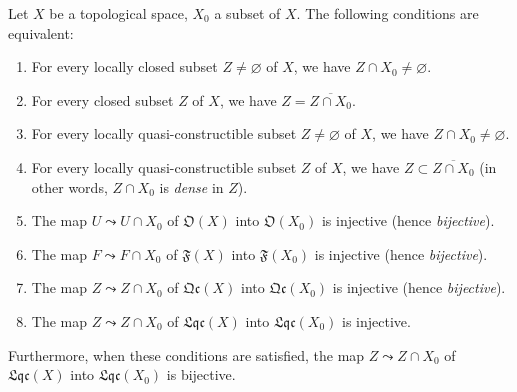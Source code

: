 \begin{proposition}[10.1.2]
\label{IV.10.1.2}
Let $X$ be a topological space, $X_0$ a subset of $X$.
The following conditions are equivalent:
\begin{enumerate}[label=\emph{\alph*)}]
  \item For every locally closed subset $Z\neq\varnothing$ of $X$, we have $Z\cap X_0\neq\varnothing$.
  \item[\rm a$'$)] For every closed subset $Z$ of $X$, we have $Z=\overline{Z\cap X_0}$.
  \item For every locally quasi-constructible subset $Z\neq\varnothing$ of $X$, we have $Z\cap X_0\neq\varnothing$.
  \item[\rm b$'$)] For every locally quasi-constructible subset $Z$ of $X$, we have $Z\subset\overline{Z\cap X_0}$ \textup{(in other words, $Z\cap X_0$ is \emph{dense} in $Z$)}.
  \item The map $U\leadsto U\cap X_0$ of $\mathfrak{O}(X)$ into $\mathfrak{O}(X_0)$ is injective \textup{(hence \emph{bijective})}.
  \item[\rm c$'$)] The map $F\leadsto F\cap X_0$ of $\mathfrak{F}(X)$ into $\mathfrak{F}(X_0)$ is injective \textup{(hence \emph{bijective})}.
  \item[\rm c$''$)] The map $Z\leadsto Z\cap X_0$ of $\mathfrak{Qc}(X)$ into $\mathfrak{Qc}(X_0)$ is injective \textup{(hence \emph{bijective})}.
  \item[\rm c$'''$)] The map $Z\leadsto Z\cap X_0$ of $\mathfrak{Lqc}(X)$ into $\mathfrak{Lqc}(X_0)$ is injective.
\end{enumerate}
Furthermore, when these conditions are satisfied, the map $Z\leadsto Z\cap X_0$ of $\mathfrak{Lqc}(X)$ into $\mathfrak{Lqc}(X_0)$ is bijective.
\end{proposition}

